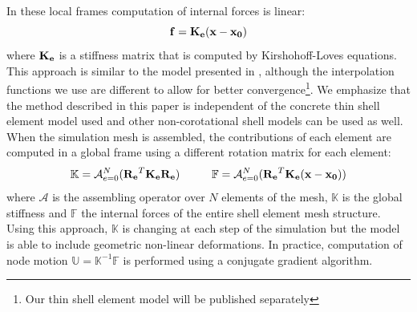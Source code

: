 In these local frames computation of internal forces is linear:
\begin{equation}
  \mathbf{f} = \mathbf{K_e}(\mathbf{x} - \mathbf{x_0})
  \label{linear_static_model} 
\end{equation}
where $\mathbf{K_e}$ is a stiffness matrix that is computed by Kirshohoff-Loves equations. This approach is similar to the model presented in  \cite{Comas2010b,Comas2010c}, although the interpolation functions we use are different to allow for better convergence\footnote{Our thin shell element model will be published separately}. We emphasize that the method described in this paper is independent of the concrete thin shell element model used and other non-corotational shell models can be used as well. When the simulation mesh is assembled, the contributions of each element are computed in a global frame using a different rotation matrix for each element:
\begin{equation}
\mathbb{K} = \mathcal{A}_{e=0}^N (\mathbf{R_e}^T \mathbf{K_e} \mathbf{R_e}) \hspace{10mm}
\mathbb{F} = \mathcal{A}_{e=0}^N ( \mathbf{R_e}^T \mathbf{K_e}(\myvec{x} - \myvec{x_0}))
\end{equation}
where $\mathcal{A}$ is the assembling operator over $N$ elements of the mesh, $\mathbb{K}$ is the global stiffness and $\mathbb{F}$ the internal forces of the entire shell element mesh structure. Using this approach, $\mathbb{K}$ is changing at each step of the simulation but the model is able to include geometric non-linear deformations. In practice, computation of node motion $\mathbb{U} = \mathbb{K}^{-1} \mathbb{F}$ is performed using a conjugate gradient algorithm.



